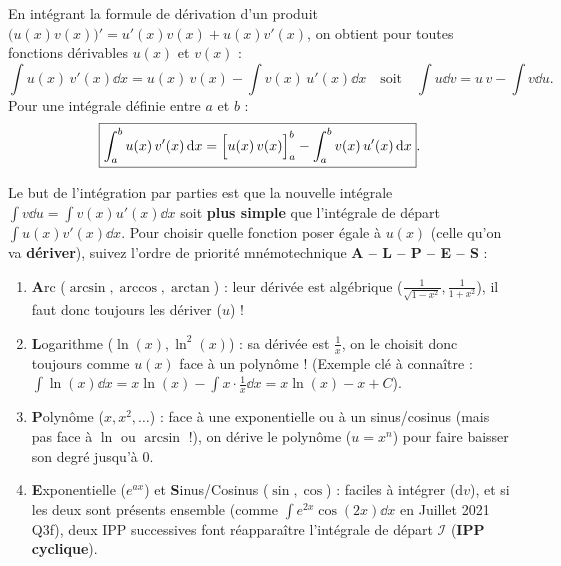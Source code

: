 \begin{theoreme}
En intégrant la formule de dérivation d'un produit $\bigl(u(x)v(x)\bigr)' = u'(x)v(x) + u(x)v'(x)$, on obtient pour toutes fonctions dérivables $u(x)$ et $v(x)$ :
\[
    \boxed{\int u(x)\,v'(x)\dd x = u(x)\,v(x) - \int v(x)\,u'(x)\dd x} \quad \text{soit} \quad \boxed{\int u\dd v = u\,v - \int v\dd u}.
\]
Pour une intégrale définie entre $a$ et $b$ :
\[
    \boxed{\int_a^b u(x)\,v'(x)\,\mathrm{d} x = \Bigl[u(x)\,v(x)\Bigr]_a^b - \int_a^b v(x)\,u'(x)\,\mathrm{d} x}.
\]
\end{theoreme}

\begin{astuce}[Comment choisir qui est $u$ (à dériver) et qui est $\mathrm{d}v = v'\dd x$ (à intégrer) ? La règle ALPES !]
Le but de l'intégration par parties est que la nouvelle intégrale $\int v\dd u = \int v(x)u'(x)\dd x$ soit \textbf{plus simple} que l'intégrale de départ $\int u(x)v'(x)\dd x$. Pour choisir quelle fonction poser égale à $u(x)$ (celle qu'on va \textbf{dériver}), suivez l'ordre de priorité mnémotechnique \textbf{A -- L -- P -- E -- S} :
\begin{enumerate}
    \item \textbf{A}rc ($\arcsin, \arccos, \arctan$) : leur dérivée est algébrique ($\frac{1}{\sqrt{1-x^2}}, \frac{1}{1+x^2}$), il faut donc toujours les dériver ($u$) !
    \item \textbf{L}ogarithme ($\ln(x), \ln^2(x)$) : sa dérivée est $\frac{1}{x}$, on le choisit donc toujours comme $u(x)$ face à un polynôme ! (Exemple clé à connaître : $\displaystyle\int \ln(x)\dd x = x\ln(x) - \int x\cdot\frac{1}{x}\dd x = \boxed{x\ln(x) - x + C}$).
    \item \textbf{P}olynôme ($x, x^2, \dots$) : face à une exponentielle ou à un sinus/cosinus (mais pas face à $\ln$ ou $\arcsin$ !), on dérive le polynôme ($u = x^n$) pour faire baisser son degré jusqu'à $0$.
    \item \textbf{E}xponentielle ($e^{ax}$) et \textbf{S}inus/Cosinus ($\sin, \cos$) : faciles à intégrer ($\mathrm{d}v$), et si les deux sont présents ensemble (comme $\int e^{2x}\cos(2x)\dd x$ en Juillet 2021 Q3f), deux IPP successives font réapparaître l'intégrale de départ $\mathcal{I}$ (\textbf{IPP cyclique}).
\end{enumerate}
\end{astuce}

